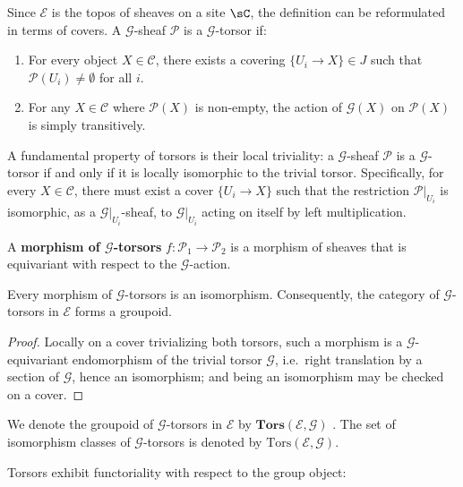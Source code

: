 Since $\mathcal{E}$ is the topos of sheaves on a site $\sC$, the definition can be reformulated in terms of covers. A $\mathcal{G}$-sheaf $\mathcal{P}$ is a $\mathcal{G}$-torsor if:
\begin{enumerate}
    \item For every object $X \in \mathcal{C}$, there exists a covering $\{ U_i \to X \} \in J$ such that $\mathcal{P}(U_i) \neq \emptyset$ for all $i$.
    \item For any $X \in \mathcal{C}$ where $\mathcal{P}(X)$ is non-empty, the action of $\mathcal{G}(X)$ on $\mathcal{P}(X)$ is simply transitively.
\end{enumerate}

A fundamental property of torsors is their local triviality: 
a $\mathcal{G}$-sheaf $\mathcal{P}$ is a $\mathcal{G}$-torsor if and only if it is locally isomorphic to the trivial torsor. 
Specifically, for every $X \in \mathcal{C}$, there must exist a cover $\{ U_i \to X \}$ such that the restriction $\mathcal{P}|_{U_i}$ is 
isomorphic, as a $\mathcal{G}|_{U_i}$-sheaf, to $\mathcal{G}|_{U_i}$ acting on itself by left multiplication.

A \textbf{morphism of $\mathcal{G}$-torsors} $f: \mathcal{P}_1 \to \mathcal{P}_2$ is a morphism of sheaves that is equivariant with respect to the $\mathcal{G}$-action.

\begin{prop}\label{prop:torsor_morphism_iso}
    Every morphism of $\mathcal{G}$-torsors is an isomorphism.
    Consequently, the category of $\mathcal{G}$-torsors in $\mathcal{E}$ forms a groupoid.
\end{prop}
\begin{proof}
    Locally on a cover trivializing both torsors, such a morphism is a $\mathcal{G}$-equivariant endomorphism
    of the trivial torsor $\mathcal{G}$, i.e.\ right translation by a section of $\mathcal{G}$, hence an
    isomorphism; and being an isomorphism may be checked on a cover.
\end{proof}

\begin{definition}
    We denote the groupoid of $\mathcal{G}$-torsors in $\mathcal{E}$ by $\mathbf{Tors}(\mathcal{E}, \mathcal{G})$ .  The set of isomorphism classes of $\mathcal{G}$-torsors is denoted by $\mathrm{Tors}(\mathcal{E}, \mathcal{G})$.
\end{definition}

Torsors exhibit functoriality with respect to the group object:

